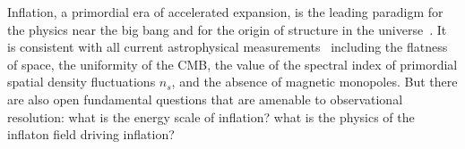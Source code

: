 Inflation, a primordial era of accelerated expansion, is the leading paradigm 
for the physics near the big bang and for the origin of structure in the universe~\cite{guth81,linde82,albrecht82,sato81,kolb94}. 
It is consistent with all current astrophysical measurements~\cite{spergel06,Tegmark:2006az,planck2015parameters,planck2015inflation} 
including the flatness of space, the uniformity of the \ac{CMB}, the value of the spectral index of primordial spatial density fluctuations $n_{s}$, 
and the absence of magnetic monopoles. But there are also open fundamental questions that are amenable to observational resolution: 
what is the energy scale of inflation? what is the physics of the inflaton field driving inflation? 


